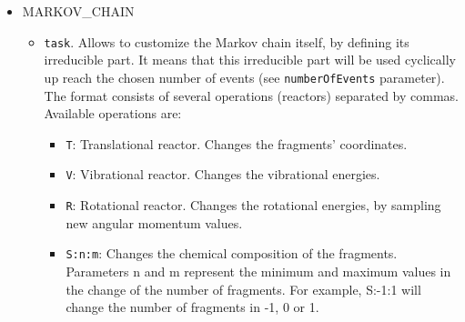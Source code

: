 \documentclass[a4paper,12pt]{article}
\begin{document}
\begin{itemize}
\item MARKOV\_CHAIN
\begin{itemize}
\item \texttt{task}.
Allows to customize the Markov chain itself, by defining its irreducible part. It means that this irreducible part will 
be used cyclically up reach the chosen number of events (see \texttt{numberOfEvents} parameter). The format consists of several 
operations (reactors) separated by commas. Available operations are:

\begin{itemize}
\item
\texttt{T}: Translational reactor. Changes the fragments' coordinates.

\item
\texttt{V}: Vibrational reactor. Changes the vibrational energies.

\item
\texttt{R}: Rotational reactor. Changes the rotational energies, by sampling new angular momentum values.

\item
\texttt{S:n:m}: Changes the chemical composition of the fragments. Parameters n and m represent the minimum and maximum 
values in the change of the number of fragments. For example, S:-1:1 will change the number of fragments in -1, 0 or 1.
\end{itemize}


\end{itemize}
\end{itemize}
\end{document}
